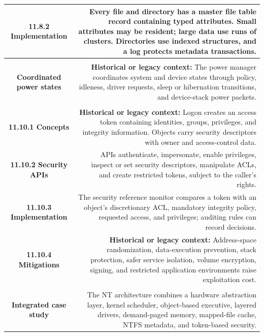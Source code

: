 \documentclass[10pt,letterpaper]{article}
\begin{document}
\begin{longtable}{C N}
\textbf{11.8.2 Implementation} & Every file and directory has a master file table record containing typed attributes. Small attributes may be resident; large data use runs of clusters. Directories use indexed structures, and a log protects metadata transactions.\\\hline
{}\\*\hline
\textbf{Coordinated power states} & \textcolor{legacy}{\textbf{Historical or legacy context:}} The power manager coordinates system and device states through policy, idleness, driver requests, sleep or hibernation transitions, and device-stack power packets.\\\hline
{}\\*\hline
\textbf{11.10.1 Concepts} & \textcolor{legacy}{\textbf{Historical or legacy context:}} Logon creates an access token containing identities, groups, privileges, and integrity information. Objects carry security descriptors with owner and access-control data.\\\hline
\textbf{11.10.2 Security APIs} & APIs authenticate, impersonate, enable privileges, inspect or set security descriptors, manipulate ACLs, and create restricted tokens, subject to the caller's rights.\\\hline
\textbf{11.10.3 Implementation} & The security reference monitor compares a token with an object's discretionary ACL, mandatory integrity policy, requested access, and privileges; auditing rules can record decisions.\\\hline
\textbf{11.10.4 Mitigations} & \textcolor{legacy}{\textbf{Historical or legacy context:}} Address-space randomization, data-execution prevention, stack protection, safer service isolation, volume encryption, signing, and restricted application environments raise exploitation cost.\\\hline
{}\\*\hline
\textbf{Integrated case study} & The NT architecture combines a hardware abstraction layer, kernel scheduler, object-based executive, layered drivers, demand-paged memory, mapped-file cache, NTFS metadata, and token-based security.\\\hline
\end{longtable}
\normalsize
\end{document}
